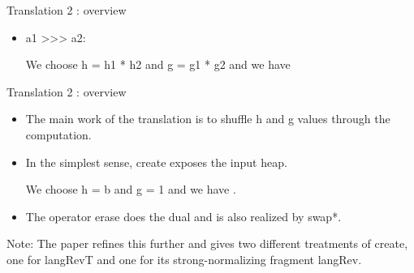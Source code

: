 \documentclass[svgnames,11pt]{beamer}
\newcommand{\red}[1]{{\color{red}{#1}}}
\begin{document}
\begin{frame}{Translation 2 : overview}

  \begin{itemize}


\item {{a1 >>> a2}}:

We choose {{h = h1 * h2}} and {{g = g1 * g2}} and we have 

\begin{center}
\scalebox{1.2}{
}
\end{center}

  \end{itemize}

  
\end{frame}

\begin{frame}{Translation 2 : overview}

\vfill
  \begin{itemize}


  \item The main work of the translation is to shuffle {{h}} and {{g}}
    values through the computation.

\vfill
  \item In the simplest sense, {{create}} exposes the input heap.


We choose {{h = b}} and {{g = 1}} and we have \red{ {{c = swap*}} }. 

\vfill
\item The operator {{erase}} does the dual and is also realized by
  {{swap*}}.


  \end{itemize}
\vfill  

  \begin{block}

    \begin{scriptsize}
      Note: The paper refines this further and gives two different
      treatments of {{create}}, one for {{langRevT}} and one for its
      strong-normalizing fragment {{langRev}}.
    \end{scriptsize}
  \end{block}


\end{frame}
\end{document}
